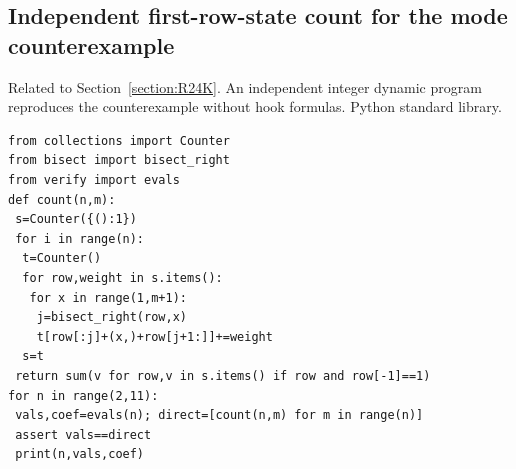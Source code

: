 \documentclass[11pt,a4paper]{article}
\begin{document}
\subsection{Independent first-row-state count for the mode counterexample}
\noindent Related to Section~\ref{section:R24K}. An independent integer dynamic program reproduces the counterexample without hook formulas. Python standard library.

\begin{Verbatim}[fontsize=\scriptsize,breaklines,breakanywhere]
from collections import Counter
from bisect import bisect_right
from verify import evals
def count(n,m):
 s=Counter({():1})
 for i in range(n):
  t=Counter()
  for row,weight in s.items():
   for x in range(1,m+1):
    j=bisect_right(row,x)
    t[row[:j]+(x,)+row[j+1:]]+=weight
  s=t
 return sum(v for row,v in s.items() if row and row[-1]==1)
for n in range(2,11):
 vals,coef=evals(n); direct=[count(n,m) for m in range(n)]
 assert vals==direct
 print(n,vals,coef)
\end{Verbatim}
\clearpage
\end{document}
